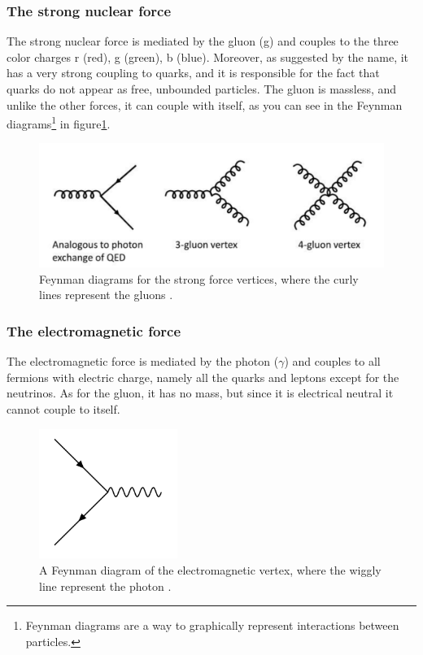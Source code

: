 \subsubsection{The strong nuclear force}
The strong nuclear force is mediated by the gluon (g) and couples to the three color charges r (red), g (green), b (blue). Moreover, as suggested by the name, it has a very strong coupling to quarks, and it is responsible for the fact that quarks do not appear as free, unbounded particles. The gluon is massless, and unlike the other forces, it can couple with itself, as you can see in the Feynman diagrams\footnote{Feynman diagrams are a way to graphically represent interactions between particles.} in figure\ref{fig:gluon_self_int}.

\begin{figure}[H]
    \centering
    \includegraphics[width = \textwidth]{Figures/FeynmanDiagrams/gluon.pdf}
    \caption{Feynman diagrams for the strong force vertices, where the curly lines represent the gluons \cite{STRONGforce}.}
    \label{fig:gluon_self_int}
\end{figure}

\subsubsection{The electromagnetic force}
The electromagnetic force is mediated by the photon ($\gamma$) and couples to all fermions with electric charge, namely all the quarks and leptons except for the neutrinos. As for the gluon, it has no mass, but since it is electrical neutral it cannot couple to itself. 

\begin{figure}[H]
    \centering
    \includegraphics[width = 0.4\textwidth]{Figures/FeynmanDiagrams/photon.png}
    \caption{A Feynman diagram of the electromagnetic vertex, where the wiggly line represent the photon \cite{EMforce}.}
    \label{fig:my_label}
\end{figure}


